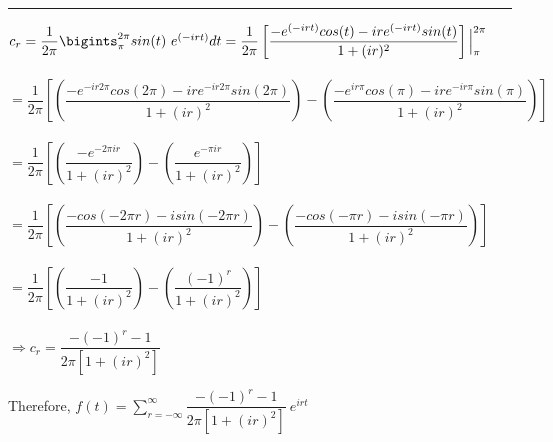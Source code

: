\documentclass[fleqn]{article}
\begin{document}
\begin{enumerate}
      \textcolor{hwColor}{ 
        \rule{15cm}{0.4pt} 
      }

      \textcolor{hwColor}{
        $c_r=\dfrac{1}{2\pi}\bigints_{\pi}^{2\pi}sin(t) ~ e^{(-irt)} dt=\dfrac{1}{2\pi}\left[\dfrac{-e^{(-irt)} cos(t)-ire^{(-irt)} sin(t)}{1+(ir)^2}\right]\Big|_{\pi}^{2\pi}$ \\
        \\
        $=\dfrac{1}{2\pi}\left[(\dfrac{-e^{-ir2\pi}cos(2\pi)-ire^{-ir2\pi}sin(2\pi)}{1+(ir)^2})-(\dfrac{-e^{ir\pi}cos(\pi)-ire^{-ir\pi}sin(\pi)}{1+(ir)^2})\right]$ \\
        \\
        $=\dfrac{1}{2\pi}\left[(\dfrac{-e^{-2\pi ir}}{1+(ir)^2})-(\dfrac{e^{-\pi ir}}{1+(ir)^2})\right]$ \\
        \\ 
        $=\dfrac{1}{2\pi}\left[(\dfrac{-cos(-2\pi r)-i sin(-2\pi r)}{1+(ir)^2})-(\dfrac{-cos(-\pi r)-isin(-\pi r)}{1+(ir)^2})\right]$ \\
        \\
        $=\dfrac{1}{2\pi}\left[(\dfrac{-1}{1+(ir)^2})-(\dfrac{(-1)^r}{1+(ir)^2})\right]$ \\
        \\
        $\Longrightarrow c_r=\dfrac{-(-1)^r-1}{2\pi\left[1+(ir)^2\right]}$
      }

      \textcolor{hwColor}{
        Therefore, $f(t)=\sum\limits_{r=-\infty}^{\infty} \dfrac{-(-1)^r-1}{2\pi\left[1+(ir)^2\right]}~e^{irt}$ \\
      }


  \end{enumerate}
\end{document}

